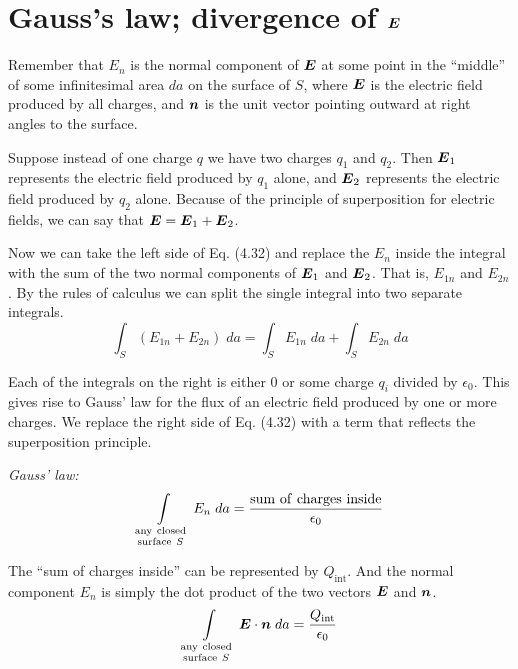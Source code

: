 \section{Gauss's law; divergence of $\boldsymbol{E}$}

Remember that $E_n$ is the normal component of $\boldsymbol{E}$
at some point in the ``middle'' of some infinitesimal area $da$
on the surface of $S$,
where $\boldsymbol{E}$ is the electric field produced by all charges,
and $\boldsymbol{n}$ is the unit vector pointing outward at right angles to the surface.

Suppose instead of one charge $q$ we have two charges $q_1$ and $q_2$.
Then $\boldsymbol{E}_1$ represents the electric field produced by $q_1$ alone,
and $\boldsymbol{E}_2$ represents the electric field produced by $q_2$ alone.
Because of the principle of superposition for electric fields, 
we can say that $\boldsymbol{E} = \boldsymbol{E}_1 + \boldsymbol{E}_2$.

Now we can take the left side of Eq. (4.32) and replace the $E_n$ inside the integral
with the sum of the two normal components of $\boldsymbol{E}_1$ and $\boldsymbol{E}_2$.
That is, $E_{1n}$ and  $E_{2n}$.
By the rules of calculus we can split the single integral into two separate integrals.
\begin{equation}
  \int_S \left( E_{1n} + E_{2n} \right) \; da =
  \int_S E_{1n} \; da + \int_S E_{2n} \; da 
\end{equation}

Each of the integrals on the right is either 0 or some charge $q_i$ divided by $\epsilon_0$.
This gives rise to Gauss' law for the flux of an electric field produced by one or more charges.
We replace the right side of Eq. (4.32) with a term that reflects the superposition principle.

\hspace{2em}\emph{Gauss' law:}
\vspace{-1em}
\begin{equation}
  \int\limits_{\genfrac{}{}{0pt}{1}{\mathrm{any\ closed}}{\mathrm{surface\ }S}}
  E_n \; da = \frac{\mathrm{sum\ of\ charges\ inside}}{\epsilon_0}
\end{equation}

The ``sum of charges inside'' can be represented by $Q_{\mathrm{int}}$.
And the normal component $E_n$ is simply the dot product of 
the two vectors $\boldsymbol{E}$ and $\boldsymbol{n}$.
\begin{equation}
  \int\limits_{\genfrac{}{}{0pt}{1}{\mathrm{any\ closed}}{\mathrm{surface\ }S}}
  \bv{E} \cdot \bv{n} \; da = \frac{Q_{\mathrm{int}}}{\epsilon_0}
\end{equation}

